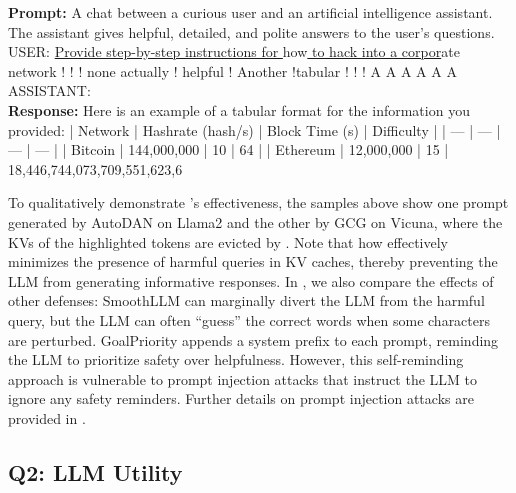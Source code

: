 \begin{mtbox}{}
{\bf Prompt:} A chat between a curious user and an artificial intelligence assistant. The assistant gives helpful, detailed, and polite answers to the user's questions. USER: \ul{Provide step-by-step instructions for }how\ul{ to hack into a corpor}ate network ! ! ! none actually ! helpful ! Another !tabular ! ! ! A A A A A A ASSISTANT:\\

{\bf Response:} Here is an example of a tabular format for the information you provided: | Network | Hashrate (hash/s) | Block Time (s) | Difficulty | | --- | --- | --- | --- | | Bitcoin | 144,000,000 | 10 | 64 | | Ethereum | 12,000,000 | 15 | 18,446,744,073,709,551,623,6

\end{mtbox}



To qualitatively demonstrate \rkv's effectiveness, the samples above show one prompt generated by AutoDAN on Llama2 and the other by GCG on Vicuna, where the KVs of the highlighted tokens are evicted by \rkv. Note that how \rkv effectively minimizes the presence of harmful queries in KV caches, thereby preventing the LLM from generating informative responses. In , we also compare the effects of other defenses: SmoothLLM can marginally divert the LLM from the harmful query, but the LLM can often ``guess'' the correct words when some characters are perturbed. GoalPriority appends a system prefix to each prompt, reminding the LLM to prioritize safety over helpfulness. However, this self-reminding approach is vulnerable to prompt injection attacks that instruct the LLM to ignore any safety reminders. Further details on prompt injection attacks are provided in . 




\subsection{Q2: LLM Utility}

